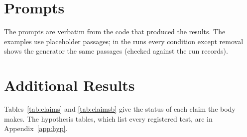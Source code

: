 \section{Prompts}
\label{app:prompts}
The prompts are verbatim from the code that produced the results. The examples use placeholder passages; in the runs every condition except removal shows the generator the same passages (checked against the run records).


\clearpage
\section{Additional Results}
\label{app:extra}
Tables~\ref{tab:claims} and \ref{tab:claimsb} give the status of each claim the body makes. The hypothesis tables,
which list every registered test, are in Appendix~\ref{app:hyp}.

